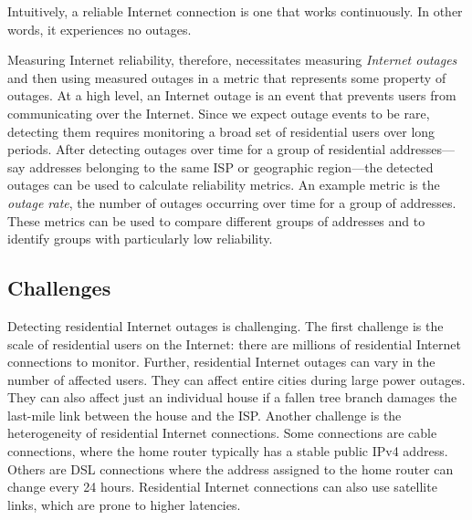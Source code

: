 
Intuitively, a reliable Internet connection is one that works
continuously. In other words, it experiences no outages. 


Measuring Internet reliability, therefore, necessitates measuring
\emph{Internet outages} and then using measured outages in a metric that
represents some property of outages. At a high level, an Internet
outage is an event that prevents users from communicating over the
Internet. Since we expect outage events to be rare, detecting them
requires monitoring a broad set of residential users over long
periods. After detecting outages over time for a group of residential
addresses---say addresses belonging to the same ISP or geographic
region---the detected outages can be used to calculate reliability
metrics. An example metric is the \emph{outage rate}, the number of
outages occurring over time for a group of addresses. These metrics
can be used to compare different groups of addresses and to identify
groups with particularly low reliability.

\subsection{Challenges}



Detecting residential Internet outages is challenging. The first challenge is the scale of residential users on the Internet: there
are millions of residential Internet connections to monitor. Further,
residential Internet outages can vary in the number of
affected users. They can affect entire cities during large power
outages. They can also affect just an individual house if a fallen
tree branch damages the last-mile link between the house and the
ISP.  Another challenge is the heterogeneity of residential Internet
connections. Some connections are cable connections, where the home router
typically has a stable public IPv4 address. Others are DSL
connections where the address assigned to the home router can change
every 24 hours. Residential Internet connections can also use
satellite links, which are prone to higher latencies. 

